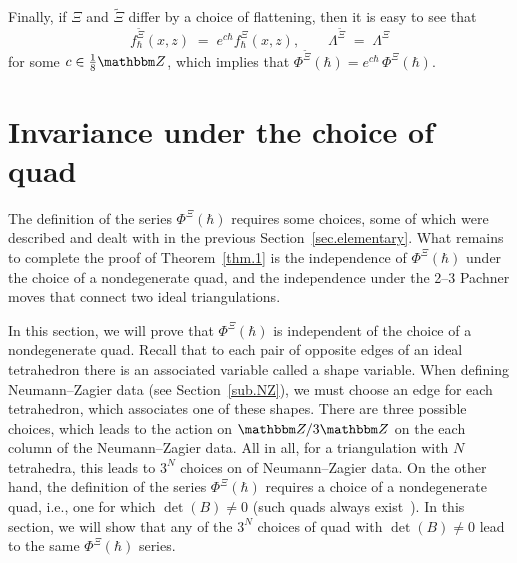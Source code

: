 \documentclass[12pt,reqno]{amsart}
\theoremstyle{definition}
\def\BZ{\mathbbm Z}
\def\be{\begin{equation}}
\def\ee{\end{equation}}
\renewcommand{\=}{\;=\;}
\begin{document}
Finally, if $\Xi$ and $\widetilde\Xi$ differ by a choice of flattening, then
it is easy to see that
\be
f^{\widetilde\Xi}_\hbar(x,z) \= e^{c\hbar} f^\Xi_\hbar(x,z), \qquad
\Lambda^{\widetilde\Xi} \= \Lambda^\Xi 
\ee
for some $c \in \frac{1}{8}\BZ$, which implies that
$\Phi^{\widetilde\Xi}(\hbar)=e^{c \hbar}\, \Phi^\Xi(\hbar)$. 



\section{Invariance under the choice of quad}
\label{sec.quad}

The definition of the series $\Phi^\Xi(\hbar)$ requires some choices,
some of which were described and dealt with in the previous
Section~\ref{sec.elementary}. What remains to complete the proof of
Theorem~\ref{thm.1} is the independence of $\Phi^\Xi(\hbar)$
under the choice of a nondegenerate quad, and the independence
under the 2--3 Pachner moves that connect two ideal triangulations.

In this section, we will prove that $\Phi^\Xi(\hbar)$ is independent
of the choice of a nondegenerate quad. Recall that to each pair of opposite
edges of an ideal tetrahedron there is an associated variable
called a shape variable. When defining Neumann--Zagier data (see
Section~\ref{sub.NZ}), we must
choose an edge for each tetrahedron, which associates one of these shapes.
There are three possible choices, which leads to the action on $\BZ/3\BZ$ on
the each column of the Neumann--Zagier data. All in all, for a triangulation
with $N$ tetrahedra, this leads to $3^{N}$ choices on of Neumann--Zagier
data. On the other hand, the definition of the series $\Phi^{\Xi}(\hbar)$
requires a choice of a nondegenerate quad, i.e., one for which $\det(B) \neq 0$
(such quads always exist~\cite[Lem.A.3]{DG}). In this section, we will show
that any of the $3^N$ choices of quad with $\det(B) \neq 0$
lead to the same $\Phi^{\Xi}(\hbar)$ series.
\end{document}
